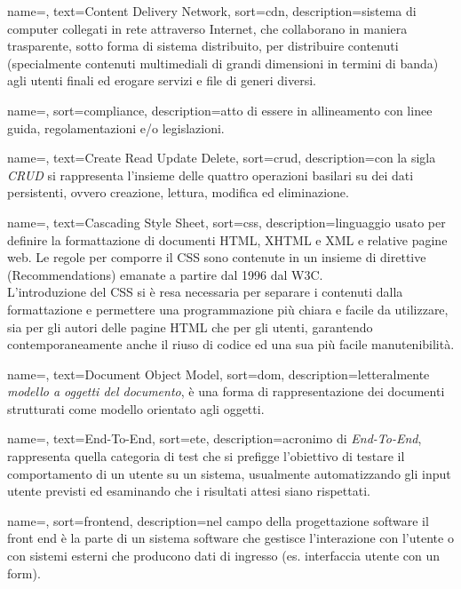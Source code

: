 {
	name=,
	text=Content Delivery Network,
	sort=cdn,
	description={sistema di computer collegati in rete attraverso Internet, che collaborano in maniera trasparente, sotto forma di sistema distribuito, per distribuire contenuti (specialmente contenuti multimediali di grandi dimensioni in termini di banda) agli utenti finali ed erogare servizi e file di generi diversi.}
}

{
	name=,
	sort=compliance,
	description={atto di essere in allineamento con linee guida, regolamentazioni e/o legislazioni.}
}

{
	name=,
	text=Create Read Update Delete,
	sort=crud,
	description={con la sigla \emph{CRUD} si rappresenta l'insieme delle quattro operazioni basilari su dei dati persistenti, ovvero creazione, lettura, modifica ed eliminazione.}
}

{
	name=,
	text=Cascading Style Sheet,
	sort=css,
	description={linguaggio usato per definire la formattazione di documenti HTML, XHTML e XML e relative pagine web. Le regole per comporre il CSS sono contenute in un insieme di direttive (Recommendations) emanate a partire dal 1996 dal W3C.\\
L'introduzione del CSS si è resa necessaria per separare i contenuti dalla formattazione e permettere una programmazione più chiara e facile da utilizzare, sia per gli autori delle pagine HTML che per gli utenti, garantendo contemporaneamente anche il riuso di codice ed una sua più facile manutenibilità.}
}

{
	name=,
	text=Document Object Model,
	sort=dom,
	description={letteralmente \emph{modello a oggetti del documento}, è una forma di rappresentazione dei documenti strutturati come modello orientato agli oggetti.}
}

{
	name=,
	text=End-To-End,
	sort=ete,
	description={acronimo di \emph{End-To-End}, rappresenta quella categoria di test che si prefigge l'obiettivo di testare il comportamento di un utente su un sistema, usualmente automatizzando gli input utente previsti ed esaminando che i risultati attesi siano rispettati.}
}

{
	name=,
	sort=frontend,
	description={nel campo della progettazione software il front end è la parte di un sistema software che gestisce l'interazione con l'utente o con sistemi esterni che producono dati di ingresso (es. interfaccia utente con un form).}
}


